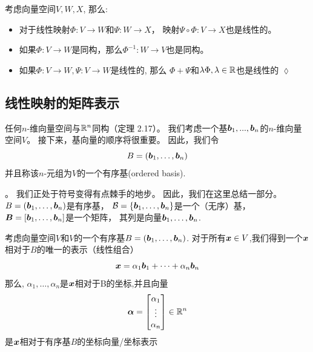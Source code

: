 \begin{remark}
    考虑向量空间$V,W,X$, 那么:
    \begin{itemize}
        \item 对于线性映射$\Phi:V \rightarrow W$和$\Psi:W \rightarrow X$，
              映射$\Psi \circ \Phi:V \rightarrow X$也是线性的。
        \item 如果$\Phi:V \rightarrow W$是同构，那么$\Phi^{−1}:W \rightarrow V$也是同构。
        \item 如果$\Phi:V \rightarrow W, \Psi:V\rightarrow W$是线性的, 那么
              $\Phi + \Psi$和$\lambda \Phi, \lambda \in \mathbb{R}$也是线性的
              \hfill $\lozenge$
    \end{itemize}
\end{remark}

\subsection{线性映射的矩阵表示}

任何$n$-维向量空间与$\mathbb{R}^n$同构（定理 2.17）。
我们考虑一个基${\boldsymbol{b}_1 ,..., \boldsymbol{b}_n}$的$n$-维向量空间$V$。
接下来，基向量的顺序将很重要。
因此，我们令
\begin{equation}
    B = (\boldsymbol{b}_1,\dots,\boldsymbol{b}_n)
\end{equation}
并且称该$n$-元组为$V$的一个有序基(ordered basis).

\begin{remark}[符号]。
    我们正处于符号变得有点棘手的地步。
    因此，我们在这里总结一部分。
    $B = (\boldsymbol{b}_1,\dots, \boldsymbol{b}_n)$是有序基，
    $\mathcal{B} = \{\boldsymbol{b}_1,\dots, \boldsymbol{b}_n\}$是一个（无序）基，
    $\boldsymbol{B} = [\boldsymbol{b}_1,\dots, \boldsymbol{b}_n ]$是一个矩阵，
    其列是向量$\boldsymbol{b}_1,\dots,\boldsymbol{b}_n$.
\end{remark}

\begin{definition}[坐标(coordinates)]
    考虑向量空间$V$和$V$的一个有序基$B = (\boldsymbol{b}_1,\dots, \boldsymbol{b}_n)$.
    对于所有$\boldsymbol{x} \in V$,我们得到一个$\boldsymbol{x}$相对于$B$的唯一的表示（线性组合）
    \begin{equation}
        \boldsymbol{x} = \alpha_1\boldsymbol{b}_1 + \dots + \alpha_n\boldsymbol{b}_n
    \end{equation}
    那么, $\alpha_1,\dots,\alpha_n$是$\boldsymbol{x}$相对于B的坐标,并且向量
    \begin{equation}
        \boldsymbol{\alpha} =
        \begin{bmatrix}
            \alpha_1 \\ \vdots \\ \alpha_n
        \end{bmatrix}
        \in \mathbb{R}^n
    \end{equation}
    是$\boldsymbol{x}$相对于有序基$B$的坐标向量/坐标表示
\end{definition}

